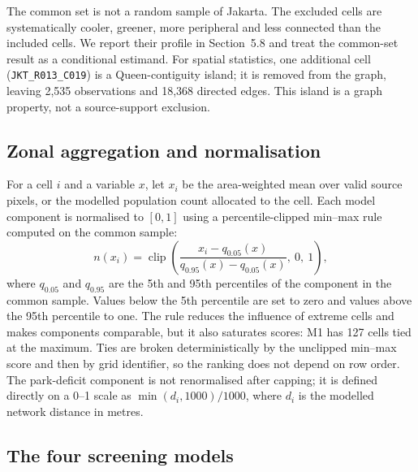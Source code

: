 \documentclass[times,twoside]{_Templates/MultiTargetManuscript}
\begin{document}
The common set is not a random sample of Jakarta. The excluded cells are
systematically cooler, greener, more peripheral and less connected than the
included cells. We report their profile in Section~5.8 and treat the common-set
result as a conditional estimand. For spatial statistics, one additional cell
(\texttt{JKT\_R013\_C019}) is a Queen-contiguity island; it is removed from the
graph, leaving 2,535 observations and 18,368 directed edges. This island is a
graph property, not a source-support exclusion.



\subsection{Zonal aggregation and normalisation}

For a cell $i$ and a variable $x$, let $x_i$ be the area-weighted mean over valid
source pixels, or the modelled population count allocated to the cell. Each
model component is normalised to $[0,1]$ using a percentile-clipped min--max
rule computed on the common sample:
\begin{equation}
n(x_i) = \operatorname{clip}\!\left(
\frac{x_i - q_{0.05}(x)}{q_{0.95}(x) - q_{0.05}(x)},\ 0,\ 1
\right),
\label{eq:norm}
\end{equation}
where $q_{0.05}$ and $q_{0.95}$ are the 5th and 95th percentiles of the
component in the common sample. Values below the 5th percentile are set to zero
and values above the 95th percentile to one. The rule reduces the influence of
extreme cells and makes components comparable, but it also saturates scores:
M1 has 127 cells tied at the maximum. Ties are broken deterministically by the
unclipped min--max score and then by grid identifier, so the ranking does not
depend on row order. The park-deficit component is not renormalised after
capping; it is defined directly on a 0--1 scale as
$\min(d_i,1000)/1000$, where $d_i$ is the modelled network distance in metres.

\subsection{The four screening models}
\end{document}
